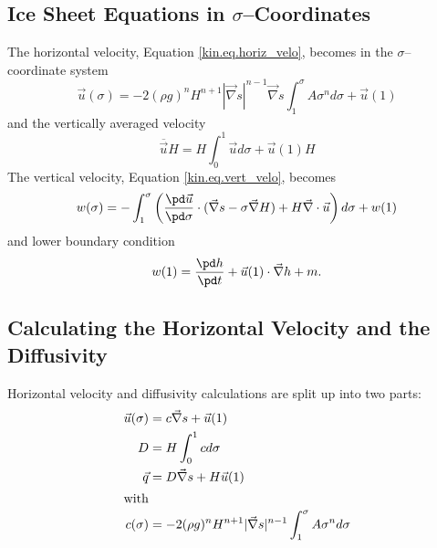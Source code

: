 \subsection{Ice Sheet Equations in $\sigma$--Coordinates}
The horizontal velocity, Equation \eqref{kin.eq.horiz_velo}, becomes in the $\sigma$--coordinate system
\begin{equation}
  \label{kin.eq.vert_velo_sigma}
  \vec u(\sigma) = -2(\rho g)^nH^{n+1}|\vec\nabla s|^{n-1}\vec\nabla s\int_1^\sigma A\sigma^nd\sigma+\vec u(1)
\end{equation}
and the vertically averaged velocity
\begin{equation}
  \label{kin.eq.avg_velo_scaled}
  \overline{\vec u} H=H\int_0^1\vec ud\sigma+\vec u(1)H
\end{equation}
The vertical velocity, Equation \eqref{kin.eq.vert_velo}, becomes
\begin{equation}
  \label{kin.eq.vert_velo_scaled}
  w(\sigma)=-\int_1^\sigma\left(\frac{\pd\vec u}{\pd\sigma}\cdot(\vec\nabla s-\sigma\vec\nabla H)+H\vec\nabla\cdot\vec u\right)d\sigma+w(1)
\end{equation}
and lower boundary condition
\begin{equation}
  w(1)=\frac{\pd h}{\pd t}+\vec u(1)\cdot\vec\nabla h+m.
\end{equation}

\subsection{Calculating the Horizontal Velocity and the Diffusivity}
Horizontal velocity and diffusivity calculations are split up into two parts:
\begin{subequations}
  \begin{align}
    \vec u(\sigma)&=c\vec\nabla s+\vec u(1)\\
    D &=H\int_0^1cd\sigma\\
    \vec q&=D\vec\nabla s+H\vec u(1)\\
    \intertext{with}
    c(\sigma)&=-2(\rho g)^nH^{n+1}|\vec\nabla s|^{n-1}\int_1^\sigma A\sigma^nd\sigma
  \end{align}
\end{subequations}

